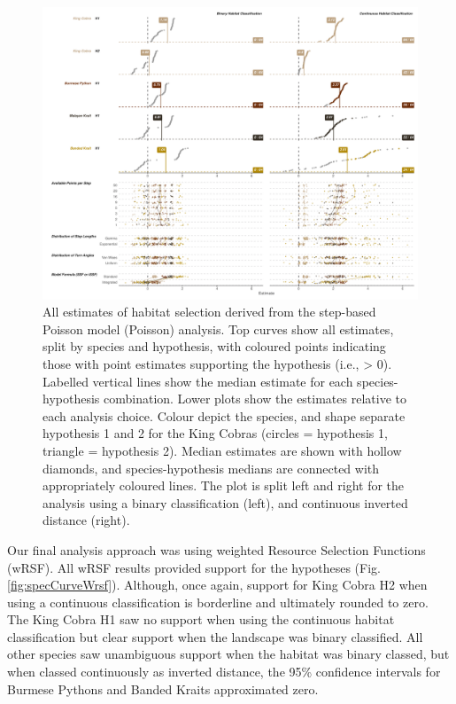 \documentclass[10pt,a4paper]{article}
\begin{document}
\begin{figure}
\includegraphics[width=1\linewidth]{../../figures/specCurve_pois} \caption{All estimates of habitat selection derived from the step-based Poisson model (Poisson) analysis. Top curves show all estimates, split by species and hypothesis, with coloured points indicating those with point estimates supporting the hypothesis (i.e., > 0). Labelled vertical lines show the median estimate for each species-hypothesis combination. Lower plots show the estimates relative to each analysis choice. Colour depict the species, and shape separate hypothesis 1 and 2 for the King Cobras (circles = hypothesis 1, triangle = hypothesis 2). Median estimates are shown with hollow diamonds, and species-hypothesis medians are connected with appropriately coloured lines. The plot is split left and right for the analysis using a binary classification (left), and continuous inverted distance (right).}\label{fig:specCurvePois}
\end{figure}

Our final analysis approach was using weighted Resource Selection Functions (wRSF).
All wRSF results provided support for the hypotheses (Fig. \ref{fig:specCurveWrsf}).
Although, once again, support for King Cobra H2 when using a continuous classification is borderline and ultimately rounded to zero.
The King Cobra H1 saw no support when using the continuous habitat classification but clear support when the landscape was binary classified.
All other species saw unambiguous support when the habitat was binary classed, but when classed continuously as inverted distance, the 95\% confidence intervals for Burmese Pythons and Banded Kraits approximated zero.
\end{document}
